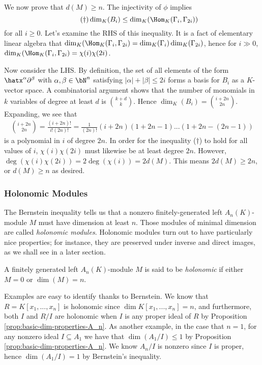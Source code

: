 \begin{prf}
	We now prove that $d(M) \geq n$. The injectivity of $\phi$ implies
	\begin{equation}\tag{$\dagger$}
		\dim_K(B_i) \leq \dim_K(\Hom_K(\Gamma_i,\Gamma_{2i}))
	\end{equation}
	for all $i \geq 0$. Let's examine the RHS of this inequality. It is a fact of elementary linear algebra that $\dim_K(\Hom_K(\Gamma_i,\Gamma_{2i}) = \dim_K(\Gamma_i)\dim_K(\Gamma_{2i})$, hence for $i \gg 0$, $\dim_K(\Hom_K(\Gamma_i,\Gamma_{2i}) = \chi(i)\chi(2i)$.

	Now consider the LHS. By definition, the set of all elements of the form $\hatx^\alpha\partial^\beta$ with $\alpha, \beta \in \bN^n$ satisfying $|\alpha| + |\beta| \leq 2i$ forms a basis for $B_i$ as a $K$-vector space. A combinatorial argument shows that the number of monomials in $k$ variables of degree at least $d$ is $\binom{k+d}{k}$. Hence $\dim_K(B_i) = \binom{i+2n}{2n}$. Expanding, we see that
	\begin{align*}
		\binom{i+2n}{2n} = \frac{(i+2n)!}{i!(2n)!} = \frac{1}{(2n)!}(i+2n)(1 + 2n - 1)...(1+2n-(2n-1))
	\end{align*}
	is a polynomial in $i$ of degree $2n$. In order for the inequality ($\dagger$) to hold for all values of $i$, $\chi(i)\chi(2i)$ must likewise be at least degree $2n$. However, $\deg(\chi(i)\chi(2i)) = 2\deg(\chi(i)) = 2d(M)$. This means $2d(M) \geq 2n$, or $d(M) \geq n$ as desired.
\end{prf}

\subsubsection{Holonomic Modules}

The Bernstein inequality tells us that a nonzero finitely-generated left $A_n(K)$-module $M$ must have dimension at least $n$. Those modules of minimal dimension are called \emph{holonomic modules}. Holonomic modules turn out to have particularly nice properties; for instance, they are preserved under inverse and direct images, as we shall see in a later section.
\begin{defn}\label{defn:holonomic-modules}
	A finitely generated left $A_n(K)$-module $M$ is said to be \emph{holonomic} if either $M = 0$ or $\dim(M) = n$.
\end{defn}
Examples are easy to identify thanks to Bernstein. We know that $R = K[x_1,...,x_n]$ is holonomic since $\dim K[x_1,...,x_n] = n$, and furthermore, both $I$ and $R/I$ are holonomic when $I$ is any proper ideal of $R$ by Proposition \ref{prop:basic-dim-properties-A_n}. As another example, in the case that $n = 1$, for any nonzero ideal $I \subseteq A_1$ we have that $\dim(A_1/I) \leq 1$ by Proposition \ref{prop:basic-dim-properties-A_n}. We know $A_n/I$ is nonzero since $I$ is proper, hence $\dim(A_1/I) = 1$ by Bernstein's inequality.

